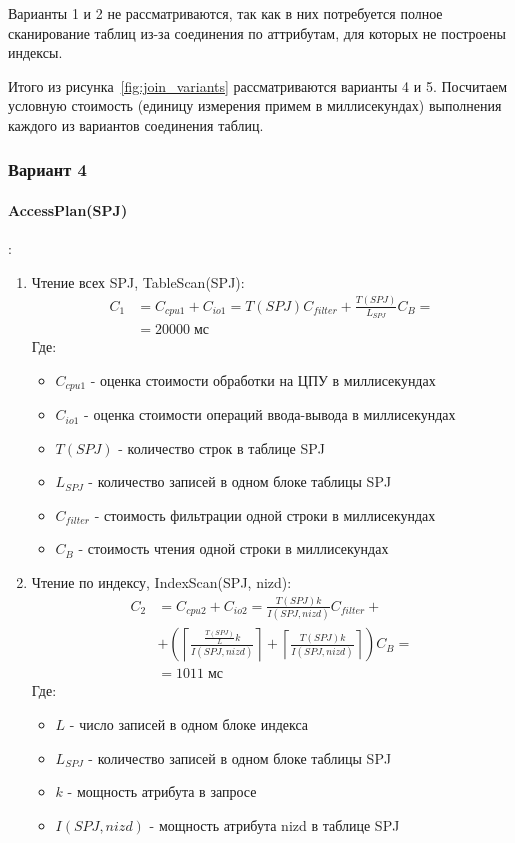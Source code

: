 \documentclass[russian,utf8,emptystyle]{eskdtext}
\begin{document}
Варианты 1 и 2 не рассматриваются, так как в них потребуется полное сканирование таблиц из-за соединения по аттрибутам, для которых не построены индексы.

Итого из рисунка~\ref{fig:join_variants} рассматриваются варианты 4 и 5. Посчитаем условную стоимость (единицу измерения примем в миллисекундах) выполнения каждого из вариантов соединения таблиц.

\subsubsection{Вариант 4}

\paragraph{AccessPlan(SPJ)}:
\begin{enumerate}[label=\arabic*)]
\item Чтение всех SPJ, TableScan(SPJ):
\begin{align*}
C_1 &= C_{cpu1} + C_{io1} = T(SPJ)C_{filter} + \frac{T(SPJ)}{L_{SPJ}}C_B = \\
& = 20000 \; \text{мс}
\end{align*}
Где:
\begin{itemize}
\item $C_{cpu1}$ - оценка стоимости обработки на ЦПУ в миллисекундах
\item $C_{io1}$ - оценка стоимости операций ввода-вывода в миллисекундах
\item $T(SPJ)$ - количество строк в таблице SPJ
\item $L_{SPJ}$ - количество записей в одном блоке таблицы SPJ
\item $C_{filter}$ - стоимость фильтрации одной строки в миллисекундах
\item $C_B$ - стоимость чтения одной строки в миллисекундах
\end{itemize}
\item Чтение по индексу, IndexScan(SPJ, nizd):
\begin{align*}
C_2 &= C_{cpu2} + C_{io2} = \frac{T(SPJ)k}{I(SPJ,nizd)}C_{filter} + \\
& + \left(\left\lceil \frac{\frac{T(SPJ)}{L} k}{I(SPJ, nizd)} \right\rceil + \left\lceil \frac{T(SPJ) k}{I(SPJ, nizd)} \right\rceil \right) C_B = \\
& = 1011 \; \text{мс}
\end{align*}
Где:
\begin{itemize}
\item $L$ - число записей в одном блоке индекса
\item $L_{SPJ}$ - количество записей в одном блоке таблицы SPJ
\item $k$ - мощность атрибута в запросе
\item $I(SPJ, nizd)$ - мощность атрибута nizd в таблице SPJ
\end{itemize}
\end{enumerate}
\end{document}
